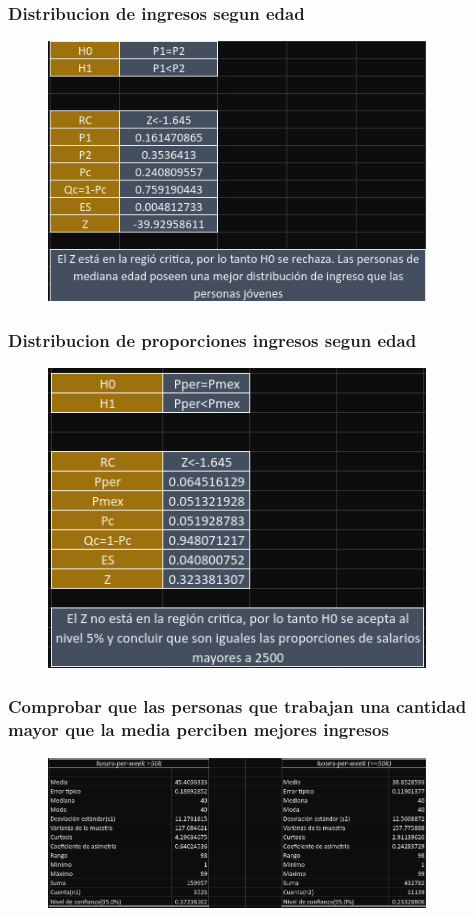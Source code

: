 \documentclass{beamer}
\begin{document}
\begin{frame}
  \frametitle{Distribucion de ingresos segun edad}
\begin{figure}[t]
    \includegraphics[width=10cm]{cuyate1.png}
\end{figure}
\end{frame}


\begin{frame}
  \frametitle{Distribucion de proporciones ingresos segun edad}
\begin{figure}[t]
    \includegraphics[width=10cm]{cuyate2.png}
\end{figure}
\end{frame}

\begin{frame}
  \frametitle{Comprobar que las personas que trabajan una cantidad
  mayor que la media perciben mejores ingresos
  }
  \begin{figure}[t]
      \includegraphics[width=10cm]{alvares1.png}
  \end{figure}
\end{frame}
\end{document}
